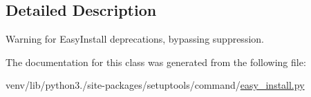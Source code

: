 \subsection{Detailed Description}
\begin{DoxyVerb}Warning for EasyInstall deprecations, bypassing suppression.
\end{DoxyVerb}
 

The documentation for this class was generated from the following file\+:\begin{DoxyCompactItemize}
\item 
venv/lib/python3./site-\/packages/setuptools/command/\hyperlink{easy__install_8py}{easy\+\_\+install.\+py}\end{DoxyCompactItemize}
